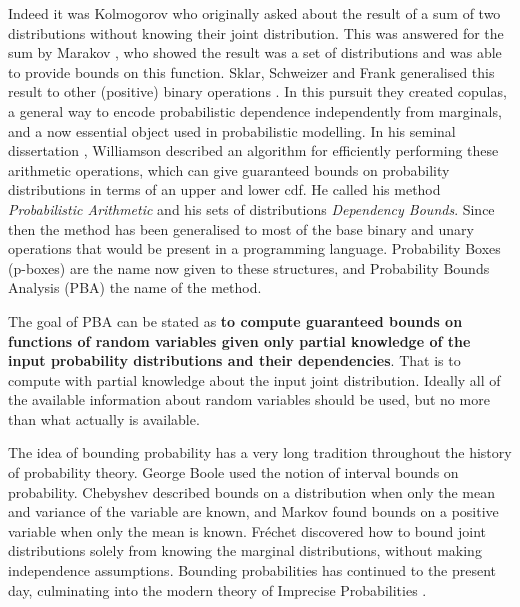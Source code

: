 \documentclass{juliacon}
\begin{document}
\noindent Indeed it was Kolmogorov who originally asked about the result of a sum of two distributions without knowing their joint distribution. This was answered for the sum by Marakov \cite{makarov1982estimates}, who showed the result was a set of distributions and was able to provide bounds on this function. Sklar, Schweizer and Frank generalised this result to other (positive) binary operations \cite{frank1987best,schweizer2011probabilistic}. In this pursuit they created copulas, a general way to encode probabilistic dependence independently from marginals, and a now essential object used in probabilistic modelling. In his seminal dissertation \cite{williamson1989probabilistic}, Williamson described an algorithm for efficiently performing these arithmetic operations, which can give guaranteed bounds on probability distributions in terms of an upper and lower cdf. He called his method \textit{Probabilistic Arithmetic} and his sets of distributions \textit{Dependency Bounds}. Since then the method has been generalised \cite{ferson2015constructing,ferson1996whereof,ferson2004arithmetic} to most of the base binary and unary operations that would be present in a programming language. Probability Boxes (p-boxes) are the name now given to these structures, and Probability Bounds Analysis (PBA) the name of the method.

The goal of PBA can be stated as \textbf{to compute guaranteed bounds on functions of random variables given only partial knowledge of the input probability distributions and their dependencies}. That is to compute with partial knowledge about the input joint distribution. Ideally all of the available information about random variables should be used, but no more than what actually is available.

The idea of bounding probability has a very long tradition throughout the history of probability theory. George Boole \cite{boole1854investigation, hailperin1986boole} used the notion of interval bounds on probability. Chebyshev \cite{chebyshev1874valeurs} described bounds on a distribution when only the mean and variance of the variable are known, and Markov \cite{markoff1900question} found bounds on a positive variable when only the mean is known.  Fréchet \cite{frechet1935generalisation} discovered how to bound joint distributions solely from knowing the marginal distributions, without making independence assumptions. Bounding probabilities has continued to the present day, culminating into the modern theory of Imprecise Probabilities \cite{walley1991statistical, klir2013uncertainty, troffaes2014lower, augustin2014introduction}.
\end{document}
